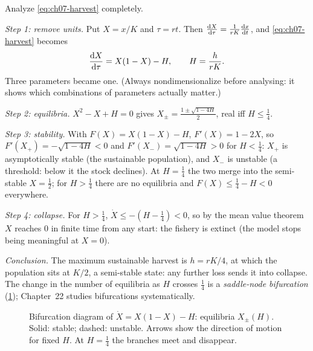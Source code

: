 \begin{example}\label{ex:ch07-harvest}
Analyze \eqref{eq:ch07-harvest} completely.

\emph{Step 1: remove units.} 
Put $X = x/K$ and $\tau = rt$. Then
$\frac{\mathrm{d}X}{\mathrm{d}\tau} = \frac{1}{rK}\frac{\mathrm{d}x}{\mathrm{d}t}$, and \eqref{eq:ch07-harvest} becomes
\begin{equation}\label{eq:ch07-harvest-dimless}
  \frac{\mathrm{d}X}{\mathrm{d}\tau} = X(1 - X) - H,\qquad H = \frac{h}{rK}.
\end{equation}
Three parameters became one. (Always nondimensionalize before analysing: it
shows which combinations of parameters actually matter.)

\emph{Step 2: equilibria.} $X^2 - X + H = 0$ gives
$X_\pm = \frac{1\pm\sqrt{1 - 4H}}{2}$, real iff $H\le\frac14$.

\emph{Step 3: stability.} With $F(X) = X(1-X) - H$, $F'(X) = 1 - 2X$, so
$F'(X_+) = -\sqrt{1 - 4H}<0$ and $F'(X_-) = \sqrt{1-4H}>0$ for $H<\frac14$:
$X_+$ is asymptotically stable (the sustainable population), and $X_-$ is
unstable (a threshold: below it the stock declines). At $H = \frac14$ the two
merge into the semi-stable $X = \frac12$; for $H>\frac14$ there are no
equilibria and $F(X)\le\frac14 - H<0$ everywhere.

\emph{Step 4: collapse.} For $H>\frac14$, $\dot X\le -(H - \tfrac14)<0$, so by
the mean value theorem $X$ reaches $0$ in finite time from any start: the
fishery is extinct (the model stops being meaningful at $X = 0$).

\emph{Conclusion.} The maximum sustainable harvest is $h = rK/4$, at which the
population sits at $K/2$, a semi-stable state: any further loss sends it into
collapse. The change in the number of equilibria as $H$ crosses $\frac14$ is a
\emph{saddle-node bifurcation} (\cref{fig:ch07-bifurcation}); Chapter~22
studies bifurcations systematically.
\end{example}

\begin{figure}[ht]
  \centering
  
  \caption{Bifurcation diagram of $\dot X = X(1-X) - H$: equilibria
  $X_\pm(H)$. Solid: stable; dashed: unstable. Arrows show the direction of
  motion for fixed $H$. At $H = \frac14$ the branches meet and disappear.}
  \label{fig:ch07-bifurcation}
\end{figure}

